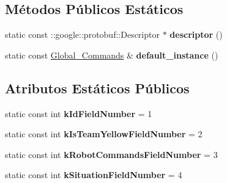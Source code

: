 \subsection*{Métodos Públicos Estáticos}
\begin{DoxyCompactItemize}
\item 
static const \+::google\+::protobuf\+::\+Descriptor $\ast$ {\bfseries descriptor} ()\hypertarget{classvss__command_1_1Global__Commands_a26e4245a80fa599d0e30613122af7ad9}{}\label{classvss__command_1_1Global__Commands_a26e4245a80fa599d0e30613122af7ad9}

\item 
static const \hyperlink{classvss__command_1_1Global__Commands}{Global\+\_\+\+Commands} \& {\bfseries default\+\_\+instance} ()\hypertarget{classvss__command_1_1Global__Commands_a9e44db388aae4a529e0bff71979eea66}{}\label{classvss__command_1_1Global__Commands_a9e44db388aae4a529e0bff71979eea66}

\end{DoxyCompactItemize}
\subsection*{Atributos Estáticos Públicos}
\begin{DoxyCompactItemize}
\item 
static const int {\bfseries k\+Id\+Field\+Number} = 1\hypertarget{classvss__command_1_1Global__Commands_a67c9ce208f0648844211d1faca128e34}{}\label{classvss__command_1_1Global__Commands_a67c9ce208f0648844211d1faca128e34}

\item 
static const int {\bfseries k\+Is\+Team\+Yellow\+Field\+Number} = 2\hypertarget{classvss__command_1_1Global__Commands_a90443d587b7a5171b061ec96660b04ef}{}\label{classvss__command_1_1Global__Commands_a90443d587b7a5171b061ec96660b04ef}

\item 
static const int {\bfseries k\+Robot\+Commands\+Field\+Number} = 3\hypertarget{classvss__command_1_1Global__Commands_a65b203ec091ad5cce5fcb7b34b01bcf1}{}\label{classvss__command_1_1Global__Commands_a65b203ec091ad5cce5fcb7b34b01bcf1}

\item 
static const int {\bfseries k\+Situation\+Field\+Number} = 4\hypertarget{classvss__command_1_1Global__Commands_a98597b870f4ed51cf1b516211e3f785d}{}\label{classvss__command_1_1Global__Commands_a98597b870f4ed51cf1b516211e3f785d}

\end{DoxyCompactItemize}
